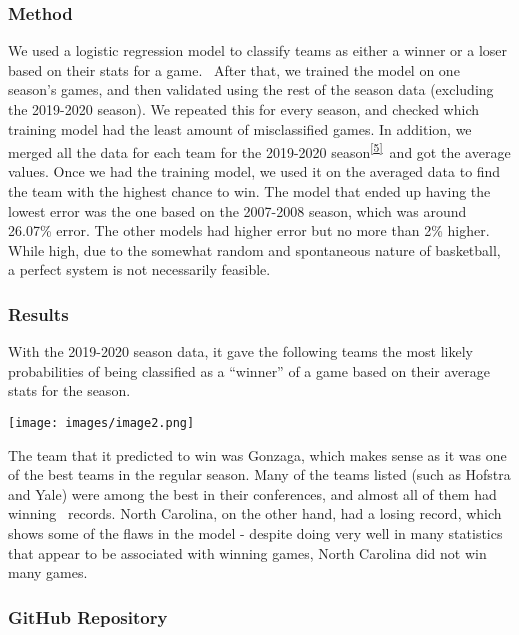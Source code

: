 \documentclass[
]{article}
\begin{document}
\hypertarget{h.dw37pcycd1oi}{%
\subsubsection{\texorpdfstring{{Method
}}{Method }}\label{h.dw37pcycd1oi}}

{We used a logistic regression model to classify teams as either a
winner or a loser based on their stats for a game. ~After that, we
trained the model on one season's games, and then validated using the
rest of the season data (excluding the 2019-2020 season). We repeated
this for every season, and checked which training model had the least
amount of misclassified games. In addition, we merged all the data for
each team for the 2019-2020
season}\textsuperscript{\protect\hyperlink{ftnt5}{{[}5{]}}}{~and got the
average values. Once we had the training model, we used it on the
averaged data to find the team with the highest chance to win. The model
that ended up having the lowest error was the one based on the 2007-2008
season, which was around 26.07\% error. The other models had higher
error but no more than 2\% higher. While high, due to the somewhat
random and spontaneous nature of basketball, a perfect system is not
necessarily feasible.}

\hypertarget{h.8nrjcbfcj293}{%
\subsubsection{\texorpdfstring{{Results
}}{Results }}\label{h.8nrjcbfcj293}}

{With the 2019-2020 season data, it gave the following teams the most
likely probabilities of being classified as a ``winner'' of a game based
on their average stats for the season.~~~~~~~~}

{\texttt{[image: images/image2.png]}}

{The team that it predicted to win was Gonzaga, which makes sense as it
was one of the best teams in the regular season. Many of the teams
listed (such as Hofstra and Yale) were among the best in their
conferences, and almost all of them had winning ~records. North
Carolina, on the other hand, had a losing record, which shows some of
the flaws in the model - despite doing very well in many statistics that
appear to be associated with winning games, North Carolina did not win
many games.}

{}

\hypertarget{h.9n6ljspbkh0i}{%
\subsubsection{\texorpdfstring{{GitHub Repository
}}{GitHub Repository }}\label{h.9n6ljspbkh0i}}
\end{document}
